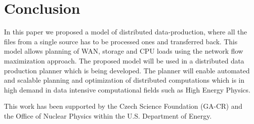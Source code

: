 \section{Conclusion}
\label{Conclusion}
In this paper we proposed a model of distributed data-production, where all the files from a single source has to be processed ones and transferred back. This model allows planning of WAN, storage and CPU loads using the network flow maximization approach. The proposed model will be used in a distributed data production planner which is being developed. The planner will enable automated and scalable planning and optimization of distributed computations which is in high demand in data intensive computational fields such as High Energy Physics.

\begin{acknowledgements}
This work has been supported by the Czech Science Foundation
(GA-CR)  and the Office of Nuclear Physics within the U.S.
Department of Energy.
\end{acknowledgements}


{}





